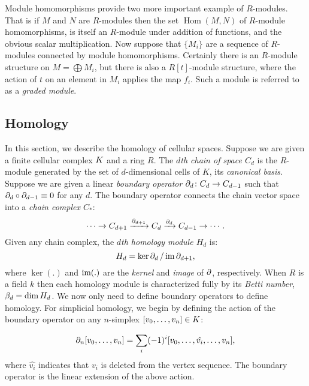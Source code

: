Module homomorphisms provide two more important example of $R$-modules. That is if $M$ and $N$ are $R$-modules then the set $\operatorname{Hom}(M,N)$ of $R$-module homomorphisms, is itself an $R$-module under addition of functions, and the obvious scalar multiplication. Now suppose that $\{M_i\}$ are a sequence of $R$-modules connected by module homomorphisms. Certainly there is an $R$-module structure on $M = \bigoplus M_i$, but there is also a $R[t]$-module structure, where the action of $t$ on an element in $M_i$ applies the map $f_i$. Such a module is referred to as a \emph{graded module}.

\subsection{Homology}
In this section, we describe the homology of cellular spaces. 
Suppose we are given a finite cellular complex $K$ and a ring $R$. 
The \emph{$d$th chain of space $C_d$} is the $R$-module generated by 
the set of $d$-dimensional cells of $K$, its \emph{canonical basis}.  
Suppose we are given a linear \emph{boundary operator} 
$\partial_d\colon C_d \rightarrow C_{d-1}$ such that 
$\partial_d \circ \partial_{d-1} \equiv 0$ for any $d$.  
The boundary operator connects the chain vector space into a 
\emph{chain complex $C_*$}:
\begin{equation*}
  \cdots \rightarrow             C_{d+1}
         \xrightarrow{\partial_{d+1}}  C_d
         \xrightarrow{\partial_d}     C_{d-1}
         \rightarrow \cdots .
\label{eqn:chaincomplex}
\end{equation*}
Given any chain complex, the \emph{$d$th homology module $H_d$} is:
\begin{equation}
  \label{eqn:homology}
  H_d = {\ker{\ensuremath{\partial}_d}}\,/\,{\operatorname{im}{\partial_{d+1}}}, 
\end{equation}
where $\ker(.)$ and $\operatorname{im}(.)$ are the \emph{kernel} and \emph{image} of $\partial$, 
respectively.
When $R$ is a field $k$ then each homology module is characterized fully by its \emph{Betti number}, 
$\beta_d = \dim{H_d}$. 
We now only need to define boundary operators to define homology. 
For simplicial homology, we begin by defining the action of the boundary operator on any
$n$-simplex $[v_0,\ldots,v_n] \in K$:

\begin{equation*}
\partial_n [v_0,\ldots,v_n] = \sum_i (-1)^i [v_0,\ldots,\hat{v_i},\ldots,v_n],
\end{equation*}
where $\hat{v_i}$ indicates that $v_i$ is deleted from the vertex 
sequence. The boundary operator is the linear extension of the above action.

